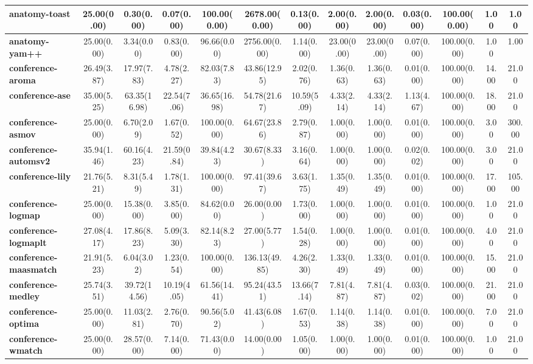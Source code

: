 \begin{tabular}{|l|c|c|c|c|c|c|c|c|c|c|c|c|}
\textbf{anatomy-toast}&25.00(0.00)&0.30(0.00)&0.07(0.00)&100.00(0.00)&2678.00(0.00)&0.13(0.00)&2.00(0.00)&2.00(0.00)&0.03(0.00)&100.00(0.00)&1.00&1.00\\\hline
\textbf{anatomy-yam++}&25.00(0.00)&3.34(0.00)&0.83(0.00)&96.66(0.00)&2756.00(0.00)&1.14(0.00)&23.00(0.00)&23.00(0.00)&0.07(0.00)&100.00(0.00)&1.00&1.00\\\hline
\textbf{conference-aroma}&26.49(3.87)&17.97(7.83)&4.78(2.27)&82.03(7.83)&43.86(12.95)&2.02(0.76)&1.36(0.63)&1.36(0.63)&0.01(0.00)&100.00(0.00)&14.00&21.00\\\hline
\textbf{conference-ase}&35.00(5.25)&63.35(16.98)&22.54(7.06)&36.65(16.98)&54.78(21.67)&10.59(5.09)&4.33(2.14)&4.33(2.14)&1.13(4.67)&100.00(0.00)&18.00&21.00\\\hline
\textbf{conference-asmov}&25.00(0.00)&6.70(2.09)&1.67(0.52)&100.00(0.00)&64.67(23.86)&2.79(0.87)&1.00(0.00)&1.00(0.00)&0.01(0.00)&100.00(0.00)&3.00&300.00\\\hline
\textbf{conference-automsv2}&35.94(1.46)&60.16(4.23)&21.59(0.84)&39.84(4.23)&30.67(8.33)&3.16(0.64)&1.00(0.00)&1.00(0.00)&0.02(0.02)&100.00(0.00)&3.00&21.00\\\hline
\textbf{conference-lily}&21.76(5.21)&8.31(5.49)&1.78(1.31)&100.00(0.00)&97.41(39.67)&3.63(1.75)&1.35(0.49)&1.35(0.49)&0.01(0.00)&100.00(0.00)&17.00&105.00\\\hline
\textbf{conference-logmap}&25.00(0.00)&15.38(0.00)&3.85(0.00)&84.62(0.00)&26.00(0.00)&1.73(0.00)&1.00(0.00)&1.00(0.00)&0.01(0.00)&100.00(0.00)&1.00&21.00\\\hline
\textbf{conference-logmaplt}&27.08(4.17)&17.86(8.23)&5.09(3.30)&82.14(8.23)&27.00(5.77)&1.54(0.28)&1.00(0.00)&1.00(0.00)&0.01(0.00)&100.00(0.00)&4.00&21.00\\\hline
\textbf{conference-maasmatch}&21.91(5.23)&6.04(3.02)&1.23(0.54)&100.00(0.00)&136.13(49.85)&4.26(2.30)&1.33(0.49)&1.33(0.49)&0.01(0.00)&100.00(0.00)&15.00&21.00\\\hline
\textbf{conference-medley}&25.74(3.51)&39.72(14.56)&10.19(4.05)&61.56(14.41)&95.24(43.51)&13.66(7.14)&7.81(4.87)&7.81(4.87)&0.03(0.02)&100.00(0.00)&21.00&21.00\\\hline
\textbf{conference-optima}&25.00(0.00)&11.03(2.81)&2.76(0.70)&90.56(5.02)&41.43(6.08)&1.67(0.53)&1.14(0.38)&1.14(0.38)&0.01(0.00)&100.00(0.00)&7.00&21.00\\\hline
\textbf{conference-wmatch}&25.00(0.00)&28.57(0.00)&7.14(0.00)&71.43(0.00)&14.00(0.00)&1.05(0.00)&1.00(0.00)&1.00(0.00)&0.01(0.00)&100.00(0.00)&1.00&21.00\\\hline

\end{tabular}
